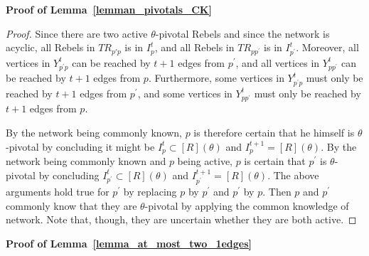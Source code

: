 \documentclass[12pt,letter]{article}
\newtheorem*{lemma*}{Lemma}
\theoremstyle{definition}
\theoremstyle{definition}
\theoremstyle{remark}
\theoremstyle{claim}
\begin{document}
\bigskip
\noindent\textbf{Proof of Lemma~\ref{lemman_pivotals_CK}}
\begin{proof}
Since there are two active $\theta$-pivotal Rebels and since the network is acyclic, all Rebels in $TR_{p{'}p}$ is in $I^t_{p}$, and all Rebels in $TR_{pp^{'}}$ is in $I^t_{p^{'}}$. Moreover, all vertices in $Y^t_{p^{'}p}$ can be reached by $t+1$ edges from $p^{'}$, and all vertices in $Y^t_{pp^{'}}$ can be reached by $t+1$ edges from $p$. Furthermore, some vertices in $Y^t_{p^{'}p}$ must only be reached by $t+1$ edges from $p^{'}$, and some vertices in $Y^t_{pp^{'}}$ must only be reached by $t+1$ edges from $p$. 

By the network being commonly known, $p$ is therefore certain that he himself is $\theta$-pivotal by concluding it might be $I^t_{p}\subset [R](\theta)$ and $I^{t+1}_{p}=[R](\theta)$. By the network being commonly known and $p$ being active, $p$ is certain that $p^{'}$ is $\theta$-pivotal by concluding $I^t_{p^{'}}\subset [R](\theta)$ and $I^{t+1}_{p^{'}}=[R](\theta)$. The above arguments hold true for $p^{'}$ by replacing $p$ by $p^{'}$ and $p^{'}$ by $p$. Then $p$ and $p^{'}$ commonly know that they are $\theta$-pivotal by applying the common knowledge of network. Note that, though, they are uncertain whether they are both active.
\end{proof}
\bigskip


\noindent\textbf{Proof of Lemma~\ref{lemma_at_most_two_1edges}} 
   
\end{document}
